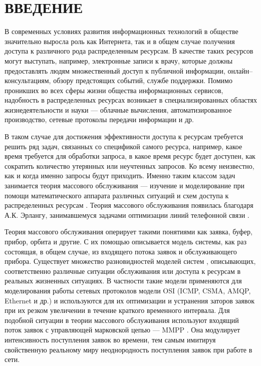 \section*{ВВЕДЕНИЕ}
В современных условиях развития информационных технологий в обществе значительно выросла роль как Интернета, так и в общем случае получения доступа к различного рода распределенным ресурсам. В качестве таких ресурсов могут выступать, например, электронные записи к врачу, которые должны предоставлять людям множественный доступ к публичной информации, онлайн--консультациям, обзору предстоящих событий, службе поддержки. Помимо проникших во всех сферы жизни общества информационных сервисов, надобность в распределенных ресурсах возникает в специализированных областях жизнедеятельности и науки --- облачные вычисления, автоматизированное производство, сетевые протоколы передачи информации и др.

В таком случае для достижения эффективности доступа к ресурсам требуется решить ряд задач, связанных со спецификой самого ресурса, например, какое время требуется для обработки запроса, в какое время ресурс будет доступен, как сократить количество утерянных или неучтенных запросов. Ко всему неизвестно, как и когда именно запросы будут приходить. Именно таким классом задач занимается теория массового обслуживания --- изучение и моделирование при помощи математического аппарата различных ситуаций и схем доступа к распределенных ресурсам \cite{nazarov2010theory}. Теория массового обслуживания появилась благодаря  А.К. Эрлангу, занимавшемуся задачами оптимизации линий телефонной связи \cite{erlang1909theory}.

Теория массового обслуживания оперирует такими понятиями как заявка, буфер, прибор, орбита и другие. С их помощью описывается модель системы, как раз состоящая, в общем случае, из входящего потока заявок и обслуживающего прибора. Существует множество разновидностей моделей систем \cite{phung2019retrial,artalejo2010accessible}, описывающих, соответственно различные ситуации обслуживания или доступа к ресурсам в реальных жизненных ситуациях. В частности такие модели применяются для моделирования работы сетевых протоколов модели OSI (ICMP, CSMA, AMQP, Ethernet и др.) \cite{bellovin2003icmp,bjornstad2006traffic,kritzinger1986performance,olypher2010computer} и используются для их оптимизации и устранения заторов заявок при их резком увеличении в течение краткого временного интервала. Для подобной ситуации в теории массового обслуживания используют входящий поток заявок с управляющей марковской цепью --- MMPP \cite{baiocchi1993steady,2019asymptotic}. Она модулирует интенсивность поступления заявок во времени, тем самым имитируя свойственную реальному миру неоднородность поступления заявок при работе в сети.
 
